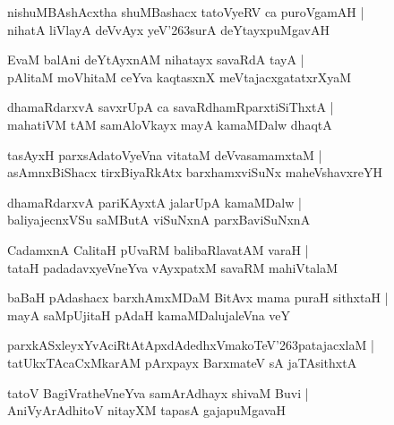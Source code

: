 \documentclass[twoside,12pt,openright]{book}
\def\S{\char'263}
\newcounter{shloka}[chapter]
\begin{document}
\begin{shloka}%
nishuMBAshAcxtha shuMBashacx tatoVyeRV ca puroVgamAH |\\
nihatA liVlayA deVvAyx yeV\S surA deYtayxpuMgavAH 
\end{shloka}

\begin{shloka}%
EvaM balAni deYtAyxnAM nihatayx savaRdA tayA |\\
pAlitaM moVhitaM ceYva kaqtasxnX meVtajacxgatatxrXyaM 
\end{shloka}

\begin{shloka}%
dhamaRdarxvA savxrUpA ca savaRdhamRparxtiSiThxtA |\\
mahatiVM tAM samAloVkayx mayA kamaMDalw dhaqtA 
\end{shloka}

\begin{shloka}%
tasAyxH parxsAdatoVyeVna vitataM deVvasamamxtaM |\\
asAmnxBiShacx tirxBiyaRkAtx barxhamxviSuNx maheVshavxreYH
\end{shloka}

\begin{shloka}%
dhamaRdarxvA pariKAyxtA jalarUpA kamaMDalw |\\
baliyajecnxVSu saMButA viSuNxnA parxBaviSuNxnA 
\end{shloka}

\begin{shloka}%
CadamxnA CalitaH pUvaRM balibaRlavatAM varaH |\\
tataH padadavxyeVneYva vAyxpatxM savaRM mahiVtalaM 
\end{shloka}

\begin{shloka}%
baBaH pAdashacx barxhAmxMDaM BitAvx mama puraH sithxtaH |\\
mayA saMpUjitaH pAdaH kamaMDalujaleVna veY 
\end{shloka}

\begin{shloka}%
parxkASxleyxYvAciRtAtApxdAdedhxVmakoTeV\S patajacxlaM |\\
tatUkxTAcaCxMkarAM pArxpayx BarxmateV sA jaTAsithxtA 
\end{shloka}

\begin{shloka}%
tatoV BagiVratheVneYva samArAdhayx shivaM Buvi |\\
AniVyArAdhitoV nitayXM tapasA gajapuMgavaH 
\end{shloka}
\end{document}
